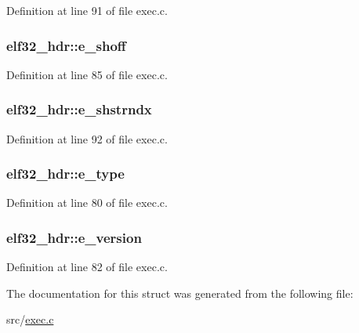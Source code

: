 Definition at line 91 of file exec.\+c.

\hypertarget{structelf32__hdr_afd8ce4ec0f05960b2306f98625be6db0}{
\subsubsection[{e\+\_\+shoff}]{ elf32\+\_\+hdr\+::e\+\_\+shoff}}\label{structelf32__hdr_afd8ce4ec0f05960b2306f98625be6db0}


Definition at line 85 of file exec.\+c.

\hypertarget{structelf32__hdr_afd7ed18333923147918975fdfa4ee99a}{
\subsubsection[{e\+\_\+shstrndx}]{ elf32\+\_\+hdr\+::e\+\_\+shstrndx}}\label{structelf32__hdr_afd7ed18333923147918975fdfa4ee99a}


Definition at line 92 of file exec.\+c.

\hypertarget{structelf32__hdr_a01aab87d9a8f658d41a1162158c07878}{
\subsubsection[{e\+\_\+type}]{ elf32\+\_\+hdr\+::e\+\_\+type}}\label{structelf32__hdr_a01aab87d9a8f658d41a1162158c07878}


Definition at line 80 of file exec.\+c.

\hypertarget{structelf32__hdr_a4324ae029dfd1967979b984a2f3e14e4}{
\subsubsection[{e\+\_\+version}]{ elf32\+\_\+hdr\+::e\+\_\+version}}\label{structelf32__hdr_a4324ae029dfd1967979b984a2f3e14e4}


Definition at line 82 of file exec.\+c.



The documentation for this struct was generated from the following file\+:\begin{DoxyCompactItemize}
\item 
src/\hyperlink{exec_8c}{exec.\+c}\end{DoxyCompactItemize}
